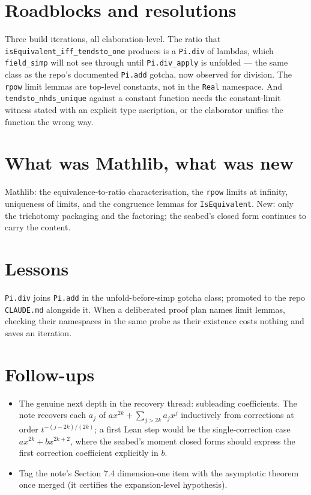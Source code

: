 \documentclass[11pt]{article}
\begin{document}
\section{Roadblocks and resolutions}

Three build iterations, all elaboration-level. The ratio that
\texttt{isEquivalent\_iff\_tendsto\_one} produces is a \texttt{Pi.div} of
lambdas,
which \texttt{field\_simp} will not see through until
\texttt{Pi.div\_apply} is unfolded --- the same class as the repo's
documented \texttt{Pi.add} gotcha, now observed for division. The
\texttt{rpow} limit lemmas are top-level constants, not in the
\texttt{Real} namespace. And \texttt{tendsto\_nhds\_unique} against a
constant function needs the constant-limit witness stated with an
explicit type ascription, or the elaborator unifies the function the
wrong way.

\section{What was Mathlib, what was new}

Mathlib: the equivalence-to-ratio characterisation, the \texttt{rpow}
limits at infinity, uniqueness of limits, and the congruence lemmas for
\texttt{IsEquivalent}. New: only the trichotomy packaging and the
factoring; the seabed's closed form continues to carry the content.

\section{Lessons}

\texttt{Pi.div} joins \texttt{Pi.add} in the unfold-before-simp gotcha
class; promoted to the repo \texttt{CLAUDE.md} alongside it. When a
deliberated proof plan names limit lemmas, checking their namespaces in
the same probe as their existence costs nothing and saves an iteration.

\section{Follow-ups}

\begin{itemize}
\item The genuine next depth in the recovery thread: subleading
coefficients. The note recovers each $a_j$ of
$a x^{2k} + \sum_{j>2k} a_j x^j$ inductively from corrections at order
$t^{-(j-2k)/(2k)}$; a first Lean step would be the single-correction
case $a x^{2k} + b x^{2k+2}$, where the seabed's moment closed forms
should express the first correction coefficient explicitly in $b$.
\item Tag the note's Section 7.4 dimension-one item with the asymptotic
theorem once merged (it certifies the expansion-level hypothesis).
\end{itemize}
\end{document}
